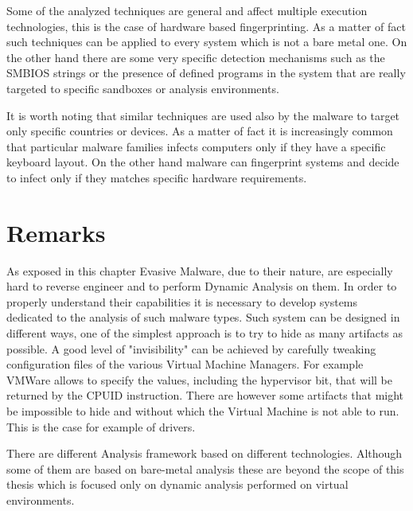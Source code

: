 Some of the analyzed techniques are general and affect multiple execution technologies, this is the case of hardware based fingerprinting. As a matter of fact such techniques can be applied to every system which is not a bare metal one. On the other hand there are some very specific detection mechanisms such as the SMBIOS strings or the presence of defined programs in the system that are really targeted to specific sandboxes or analysis environments. 

It is worth noting that similar techniques are used also by the malware to target only specific countries or devices. As a matter of fact it is increasingly common that particular malware families infects computers only if they have a specific keyboard layout. On the other hand malware can fingerprint systems and decide to infect only if they matches specific hardware requirements. 

\section{Remarks}


As exposed in this chapter Evasive Malware, due to their nature, are especially hard to reverse engineer and to perform Dynamic Analysis on them. In order to properly understand their capabilities it is necessary to develop systems dedicated to the analysis of such malware types. Such system can be designed in different ways, one of the simplest approach is to try to hide as many artifacts as possible. A good level of "invisibility" can be achieved by carefully tweaking configuration files of the various Virtual Machine Managers. For example VMWare allows to specify the values, including the hypervisor bit, that will be returned by the CPUID instruction. There are however some artifacts that might be impossible to hide and without which the Virtual Machine is not able to run. This is the case for example of drivers. 

There are different Analysis framework based on different technologies. Although some of them are based on bare-metal analysis these are beyond the scope of this thesis which is focused only on dynamic analysis performed on virtual environments.

